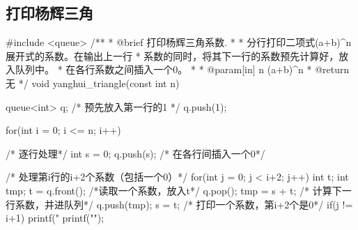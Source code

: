 \subsection{打印杨辉三角}

\begin{Codex}[label=yanghui_triangle.cpp]
#include <queue>
/**
 * @brief 打印杨辉三角系数.
 *
 * 分行打印二项式(a+b)^n展开式的系数。在输出上一行
 * 系数的同时，将其下一行的系数预先计算好，放入队列中。
 * 在各行系数之间插入一个0。
 *
 * @param[in] n (a+b)^n
 * @return 无
 */
void yanghui_triangle(const int n) {
    queue<int> q;
    /* 预先放入第一行的1 */
    q.push(1);

    for(int i = 0; i <= n; i++) {     /* 逐行处理*/
        int s = 0;
        q.push(s);      /* 在各行间插入一个0*/

        /* 处理第i行的i+2个系数（包括一个0）*/
        for(int j = 0; j < i+2; j++) {
            int t;
            int tmp;
            t = q.front();  /*读取一个系数，放入t*/
            q.pop();
            tmp = s + t;      /* 计算下一行系数，并进队列*/
            q.push(tmp);
            s = t;            /* 打印一个系数，第i+2个是0*/
            if(j != i+1) {
                printf("%
            }
        }
        printf("\n");
    }
}
\end{Codex}
